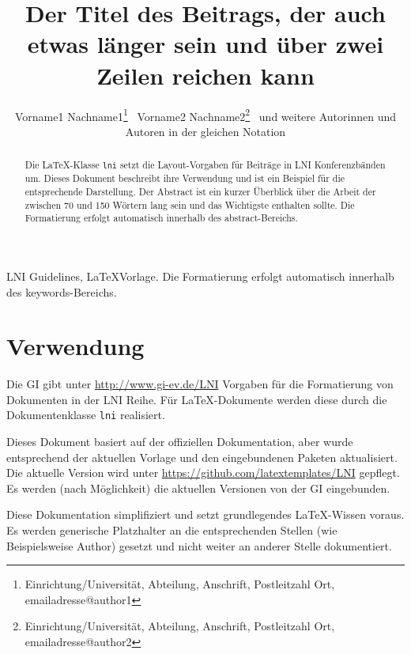 \documentclass{lni}
\author{
Vorname1 Nachname1\footnote{Einrichtung/Universität, Abteilung, Anschrift, Postleitzahl Ort, emailadresse@author1} \, %
Vorname2 Nachname2\footnote{Einrichtung/Universität, Abteilung, Anschrift, Postleitzahl Ort, emailadresse@author2} \, %
und weitere Autorinnen und Autoren in der gleichen Notation}
\title{Der Titel des Beitrags, der auch etwas länger sein und über zwei Zeilen reichen kann}
\begin{document}
\maketitle

\thispagestyle{lnifirstpage}
\pagestyle{lni}

\setcounter{footnote}{2}

\begin{abstract}
Die \LaTeX-Klasse \texttt{lni} setzt die Layout-Vorgaben für Beiträge in LNI Konferenzbänden um.
Dieses Dokument beschreibt ihre Verwendung und ist ein Beispiel für die entsprechende Darstellung.
Der Abstract ist ein kurzer Überblick über die Arbeit der zwischen 70 und 150 Wörtern lang sein und das Wichtigste enthalten sollte.
Die Formatierung erfolgt automatisch innerhalb des abstract-Bereichs.
\end{abstract}

\begin{keywords}
LNI Guidelines, \LaTeX Vorlage. Die Formatierung erfolgt automatisch innerhalb des keywords-Bereichs.
\end{keywords}

\section{Verwendung}
Die GI gibt unter \url{http://www.gi-ev.de/LNI} Vorgaben für die Formatierung von Dokumenten in der LNI Reihe.
Für \LaTeX-Dokumente werden diese durch die Dokumentenklasse \texttt{lni} realisiert.

Dieses Dokument basiert auf der offiziellen Dokumentation, aber wurde entsprechend der aktuellen Vorlage und den eingebundenen Paketen aktualisiert.
Die aktuelle Version wird unter \url{https://github.com/latextemplates/LNI} gepflegt.
Es werden (nach Möglichkeit) die aktuellen Versionen von der GI eingebunden.

Diese Dokumentation simplifiziert und setzt grundlegendes LaTeX-Wissen voraus.
Es werden generische Platzhalter an die entsprechenden Stellen (wie Beispielsweise Author) gesetzt und nicht weiter an anderer Stelle dokumentiert.
\end{document}
